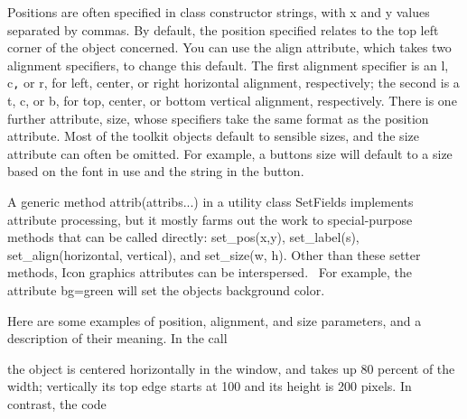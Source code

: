 
Positions are often specified in class constructor
strings, with x and y values separated by commas. By default, the
position specified relates to the top left corner of the object
concerned. You can use the \textsf{{\textquotedbl}align{\textquotedbl}}
attribute, which takes two alignment specifiers, to change this
default. The first alignment specifier is an
\textsf{{\textquotedbl}l{\textquotedbl}},
\textsf{{\textquotedbl}c{\textquotedbl}}\texttt{,} or
\textsf{{\textquotedbl}r{\textquotedbl}}, for left, center, or right
horizontal alignment, respectively; the second is a
\textsf{{\textquotedbl}t{\textquotedbl}},
\textsf{{\textquotedbl}c{\textquotedbl}}, or
\textsf{{\textquotedbl}b{\textquotedbl}}, for top, center, or bottom
vertical alignment, respectively. There is one further attribute,
\textsf{{\textquotedbl}size{\textquotedbl}}, whose specifiers take the
same format as the position attribute. Most of the toolkit objects
default to sensible sizes, and the size attribute can often be omitted.
For example, a button{\textquotesingle}s size will default to a size
based on the font in use and the string in the button.

A generic method \textsf{attrib(attribs...)} in a utility class
\textsf{SetFields} implements attribute
processing, but it mostly farms out the work to special-purpose methods
that can be called directly: \textsf{set\_pos(x,y)},
\textsf{set\_label(s)}, \textsf{set\_align(horizontal, vertical)}, and
\textsf{set\_size(w, }\textsf{h)}. Other than these setter methods,
Icon graphics attributes can be interspersed. \ For example, the
attribute \textsf{{\textquotedbl}bg=green{\textquotedbl}} will set the
object{\textquotesingle}s background color.

Here are some examples of position, alignment, and size parameters, and
a description of their meaning. In the call


\noindent
the object is centered horizontally in the window, and takes up 80
percent of the width; vertically its top edge starts at 100 and its
height is 200 pixels. In contrast, the code

